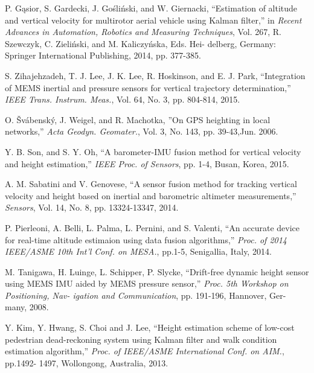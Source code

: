 \documentclass[10pt,journal,compsoc]{IEEEtran}
\begin{document}
\begin{thebibliography}{1}

        P. G\k{a}sior, S. Gardecki, J. Go\'{s}li\'{n}ski, and W. Giernacki,
        ``Estimation of altitude and vertical velocity for multirotor
        aerial vehicle using Kalman filter,'' in \emph{Recent Advances in
        Automation, Robotics and Measuring Techniques}, Vol. 267,
        R. Szewczyk, C. Zieli\'{n}ski, and M. Kaliczy\'{n}ska, Eds. Hei-
        delberg, Germany: Springer International Publishing, 2014,
        pp. 377-385.

        S. Zihajehzadeh, T. J. Lee, J. K. Lee, R. Hoskinson, and E.
        J. Park, ``Integration of MEMS inertial and pressure sensors
        for vertical trajectory determination,'' \emph{IEEE Trans. Instrum.
        Meas.}, Vol. 64, No. 3, pp. 804-814, 2015.

        O. \v{S}v\'{a}bensk\'{y}, J. Weigel, and R. Machotka, ''On GPS
        heighting in local networks,'' \emph{Acta Geodyn. Geomater.}, Vol.
        3, No. 143, pp. 39-43,Jun. 2006.

        Y. B. Son, and S. Y. Oh, ``A barometer-IMU fusion method
        for vertical velocity and height estimation,'' \emph{IEEE Proc. of
        Sensors}, pp. 1-4, Busan, Korea, 2015.

        A. M. Sabatini and V. Genovese, ``A sensor fusion method
        for tracking vertical velocity and height based on inertial
        and barometric altimeter measurements,'' \emph{Sensors}, Vol. 14,
        No. 8, pp. 13324-13347, 2014.

        P. Pierleoni, A. Belli, L. Palma, L. Pernini, and S. Valenti,
        ``An accurate device for real-time altitude estimaion using
        data fusion algorithms,'' \emph{Proc. of 2014 IEEE/ASME 10th
        Int'l Conf. on MESA.}, pp.1-5, Senigallia, Italy, 2014.

        M. Tanigawa, H. Luinge, L. Schipper, P. Slycke, ``Drift-free
        dynamic height sensor using MEMS IMU aided by MEMS
        pressure sensor,'' \emph{Proc. 5th Workshop on Positioning, Nav-
        igation and Communication}, pp. 191-196, Hannover, Ger-
        many, 2008.

        Y. Kim, Y. Hwang, S. Choi and J. Lee, ``Height estimation
        scheme of low-cost pedestrian dead-reckoning system using
        Kalman filter and walk condition estimation algorithm,''
        \emph{Proc. of IEEE/ASME International Conf. on AIM.}, pp.1492-
        1497, Wollongong, Australia, 2013.


\end{thebibliography}
\end{document}
